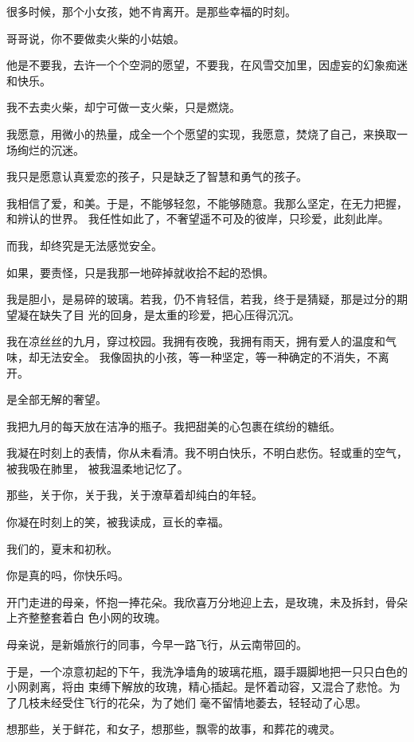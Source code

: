\documentclass[12pt,a4paper]{article}
\def\blankrev{\vspace{1ex}}									%
\begin{document}
		很多时候，那个小女孩，她不肯离开。是那些幸福的时刻。


		哥哥说，你不要做卖火柴的小姑娘。

		他是不要我，去许一个个空洞的愿望，不要我，在风雪交加里，因虚妄的幻象痴迷和快乐。

		我不去卖火柴，却宁可做一支火柴，只是燃烧。

		我愿意，用微小的热量，成全一个个愿望的实现，我愿意，焚烧了自己，来换取一场绚烂的沉迷。

		我只是愿意认真爱恋的孩子，只是缺乏了智慧和勇气的孩子。

		我相信了爱，和美。于是，不能够轻忽，不能够随意。我那么坚定，在无力把握，和辨认的世界。
	我任性如此了，不奢望遥不可及的彼岸，只珍爱，此刻此岸。


		而我，却终究是无法感觉安全。

		如果，要责怪，只是我那一地碎掉就收拾不起的恐惧。

		我是胆小，是易碎的玻璃。若我，仍不肯轻信，若我，终于是猜疑，那是过分的期望凝在缺失了目
	光的回身，是太重的珍爱，把心压得沉沉。

		我在凉丝丝的九月，穿过校园。我拥有夜晚，我拥有雨天，拥有爱人的温度和气味，却无法安全。
	我像固执的小孩，等一种坚定，等一种确定的不消失，不离开。

		是全部无解的奢望。


		\blankrev
		我把九月的每天放在洁净的瓶子。我把甜美的心包裹在缤纷的糖纸。

		我凝在时刻上的表情，你从未看清。我不明白快乐，不明白悲伤。轻或重的空气，被我吸在肺里，
	被我温柔地记忆了。

		那些，关于你，关于我，关于潦草着却纯白的年轻。

		你凝在时刻上的笑，被我读成，亘长的幸福。

		我们的，夏末和初秋。

		你是真的吗，你快乐吗。

	\endwriting



		开门走进的母亲，怀抱一捧花朵。我欣喜万分地迎上去，是玫瑰，未及拆封，骨朵上齐整整套着白
	色小网的玫瑰。

		母亲说，是新婚旅行的同事，今早一路飞行，从云南带回的。


		于是，一个凉意初起的下午，我洗净墙角的玻璃花瓶，蹑手蹑脚地把一只只白色的小网剥离，将由
	束缚下解放的玫瑰，精心插起。是怀着动容，又混合了悲怆。为了几枝未经受住飞行的花朵，为了她们
	毫不留情地萎去，轻轻动了心思。

		想那些，关于鲜花，和女子，想那些，飘零的故事，和葬花的魂灵。
\end{document}
